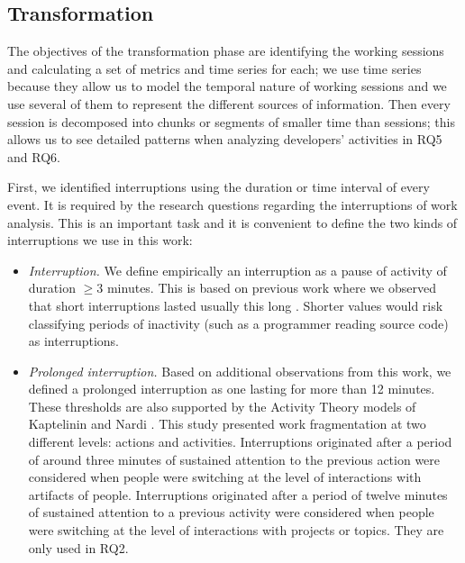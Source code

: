\subsection{Transformation }

\begin{changedforreviewerlong}
The objectives of the transformation phase are identifying the working sessions and calculating a set of metrics and time series for each; we use time series because they allow us to model the temporal nature of working sessions and we use several of them to represent the different sources of information. Then every session is decomposed into chunks or segments of smaller time than sessions; this allows us to see detailed patterns when analyzing developers' activities in RQ5 and RQ6.


First, we identified interruptions using the duration or time interval of every event. It is required by the research questions regarding the interruptions of work analysis. This is an important task and it is convenient to define the two kinds of interruptions we use in this work:
\end{changedforreviewerlong}

\begin{itemize}
	\item \textit{Interruption.} We define empirically an interruption as a pause of activity of duration $\geq 3$ minutes. This is based on previous work where we observed that short interruptions lasted usually this long \cite{GM04}. Shorter values would risk classifying periods of inactivity (such as a programmer reading source code) as interruptions.
	
	\item \textit{Prolonged interruption.} Based on additional observations from this work, we defined a prolonged interruption as one lasting for more than 12 minutes. These thresholds are also supported by the Activity Theory models of Kaptelinin and Nardi \cite{KaptelininN07}. This study presented work fragmentation at two different levels: actions and activities. Interruptions originated after a period of around three minutes of sustained attention to the previous action were considered when people were switching at the level of interactions with artifacts of people. Interruptions originated after a period of twelve minutes of sustained attention to a previous activity were considered when people were switching at the level of interactions with projects or topics. They are only used in RQ2.
\end{itemize}

